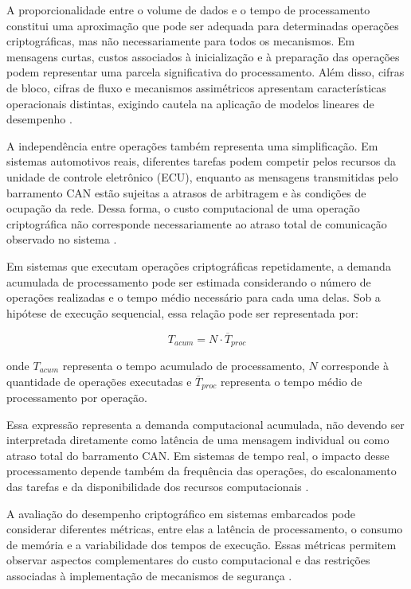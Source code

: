 A proporcionalidade entre o volume de dados e o tempo de processamento constitui uma aproximação que pode ser adequada para determinadas operações criptográficas, mas não necessariamente para todos os mecanismos. Em mensagens curtas, custos associados à inicialização e à preparação das operações podem representar uma parcela significativa do processamento. Além disso, cifras de bloco, cifras de fluxo e mecanismos assimétricos apresentam características operacionais distintas, exigindo cautela na aplicação de modelos lineares de desempenho \cite{bernstein2008chacha,blanc2022benchmarking}.

A independência entre operações também representa uma simplificação. Em sistemas automotivos reais, diferentes tarefas podem competir pelos recursos da unidade de controle eletrônico (ECU), enquanto as mensagens transmitidas pelo barramento CAN estão sujeitas a atrasos de arbitragem e às condições de ocupação da rede. Dessa forma, o custo computacional de uma operação criptográfica não corresponde necessariamente ao atraso total de comunicação observado no sistema \cite{davis2007controller,navet2017automotive}.

Em sistemas que executam operações criptográficas repetidamente, a demanda acumulada de processamento pode ser estimada considerando o número de operações realizadas e o tempo médio necessário para cada uma delas. Sob a hipótese de execução sequencial, essa relação pode ser representada por:

\begin{equation}
T_{acum} = N \cdot \overline{T}_{proc}
\end{equation}

\noindent onde $T_{acum}$ representa o tempo acumulado de processamento, $N$ corresponde à quantidade de operações executadas e $\overline{T}_{proc}$ representa o tempo médio de processamento por operação.

Essa expressão representa a demanda computacional acumulada, não devendo ser interpretada diretamente como latência de uma mensagem individual ou como atraso total do barramento CAN. Em sistemas de tempo real, o impacto desse processamento depende também da frequência das operações, do escalonamento das tarefas e da disponibilidade dos recursos computacionais \cite{burns2001real,thiele2004design}.

A avaliação do desempenho criptográfico em sistemas embarcados pode considerar diferentes métricas, entre elas a latência de processamento, o consumo de memória e a variabilidade dos tempos de execução. Essas métricas permitem observar aspectos complementares do custo computacional e das restrições associadas à implementação de mecanismos de segurança \cite{blanc2022benchmarking}.

